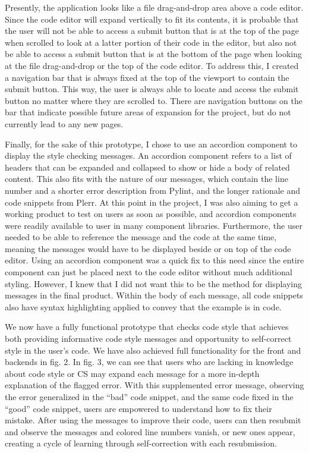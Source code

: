 \documentclass[10pt,twocolumn]{article}
\begin{document}
Presently, the application looks like a file drag-and-drop area above a code editor. 
Since the code editor will expand vertically to fit its contents, it is probable that the user will not be able to access a submit button that is at the top of the page when scrolled to look at a latter portion of their code in the editor, but also not be able to access a submit button that is at the bottom of the page when looking at the file drag-and-drop or the top of the code editor. 
To address this, I created a navigation bar that is always fixed at the top of the viewport to contain the submit button. 
This way, the user is always able to locate and access the submit button no matter where they are scrolled to. 
There are navigation buttons on the bar that indicate possible future areas of expansion for the project, but do not currently lead to any new pages. 

Finally, for the sake of this prototype, I chose to use an accordion component to display the style checking messages. 
An accordion component refers to a list of headers that can be expanded and collapsed to show or hide a body of related content. 
This also fits with the nature of our messages, which contain the line number and a shorter error description from Pylint, and the longer rationale and code snippets from Plerr. 
At this point in the project, I was also aiming to get a working product to test on users as soon as possible, and accordion components were readily available to user in many component libraries. 
Furthermore, the user needed to be able to reference the message and the code at the same time, meaning the messages would have to be displayed beside or on top of the code editor. 
Using an accordion component was a quick fix to this need since the entire component can just be placed next to the code editor without much additional styling. 
However, I knew that I did not want this to be the method for displaying messages in the final product. 
Within the body of each message, all code snippets also have syntax highlighting applied to convey that the example is in code. 

We now have a fully functional prototype that checks code style that achieves both providing informative code style messages and opportunity to self-correct style in the user's code. 
We have also achieved full functionality for the front and backends in fig. 2.
In fig. 3, we can see that users who are lacking in knowledge about code style or CS may expand each message for a more in-depth explanation of the flagged error. 
With this supplemented error message, observing the error generalized in the “bad” code snippet, and the same code fixed in the “good” code snippet, users are empowered to understand how to fix their mistake. 
After using the messages to improve their code, users can then resubmit and observe the messages and colored line numbers vanish, or new ones appear, creating a cycle of learning through self-correction with each resubmission. 
\end{document}

